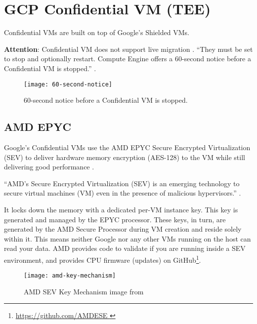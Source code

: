 
\section{GCP Confidential VM (TEE)}


Confidential VMs are built on top of Google's Shielded VMs. 

\textbf{Attention}: Confidential VM does not support live migration 
\citep{google_creating_2022}. 
“They must be set to stop and optionally restart. 
Compute Engine offers a 60-second notice before a Confidential VM is stopped.” 
\citep{google_live_2022}.

\begin{figure}[!ht]
    \centering
    \texttt{[image: 60-second-notice]}
    \caption{60-second notice before a Confidential VM is stopped.}
    \label{fig:60-second-notice}
\end{figure}

\subsection{AMD EPYC} 
Google's Confidential VMs use the AMD EPYC Secure Encrypted Virtualization (SEV) 
to deliver hardware memory encryption (AES-128) to the VM 
while still delivering good performance \citep{amd_amd_2022, amd_secure_2019}. 

“AMD’s Secure Encrypted Virtualization (SEV) is an emerging technology to secure virtual machines (VM) 
even in the presence of malicious hypervisors.” \citep{li_exploiting_2019}.

It locks down the memory with a dedicated per-VM instance key. 
This key is generated and managed by the EPYC processor. 
These keys, in turn, are generated by the AMD Secure Processor during VM creation and reside solely within it.
This means neither Google nor any other VMs running on the host can read your data. 
AMD provides code to validate if you are running inside a SEV environment, 
and provides CPU firmware (updates) on GitHub\footnote{\url{https://github.com/AMDESE }}.

\begin{figure}[!ht]
    \centering
    \texttt{[image: amd-key-mechanism]}
    \caption{AMD SEV Key Mechanism image from \cite{amd_amd_2020}}
    \label{fig:amd-key-mechanism}
\end{figure}



